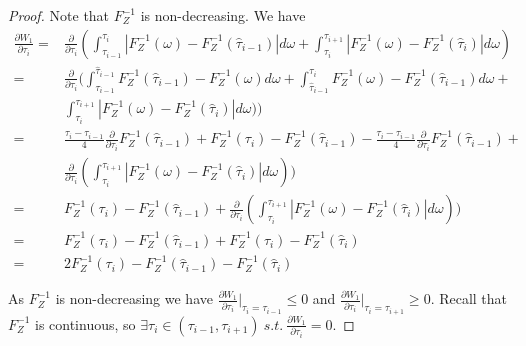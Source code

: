 \documentclass{article}
\begin{document}
\begin{proof}
Note that $F^{-1}_Z$ is non-decreasing. We have
\begin{equation*}
    \begin{split}
        \frac{\partial W_1}{\partial \tau_i}=&\frac{\partial}{\partial \tau_i}(\int_{\tau_{i-1}}^{\tau_i} \left|F^{-1}_{Z}(\omega)-F^{-1}_{Z}(\hat{\tau}_{i-1})\right| d \omega + \int_{\tau_{i}}^{\tau_{i+1}} \left|F^{-1}_{Z}(\omega)-F^{-1}_{Z}(\hat{\tau}_{i})\right| d \omega)\\
        =&\frac{\partial}{\partial \tau_i}(\int_{\tau_{i-1}}^{\hat{\tau}_{i-1}} F^{-1}_{Z}(\hat{\tau}_{i-1})-F^{-1}_{Z}(\omega) d \omega + 
        \int_{\hat{\tau}_{i-1}}^{\tau_{i}} F^{-1}_{Z}(\omega)-F^{-1}_{Z}(\hat{\tau}_{i-1}) d \omega +\\
        &
        \int_{\tau_{i}}^{\tau_{i+1}} \left|F^{-1}_{Z}(\omega)-F^{-1}_{Z}(\hat{\tau}_{i})\right| d \omega))\\
        =&\frac{\tau_i-\tau_{i-1}}{4}\frac{\partial}{\partial \tau_i}F^{-1}_Z(\hat{\tau}_{i-1})+F^{-1}_Z(\tau_i)-F^{-1}_Z(\hat{\tau}_{i-1})-\frac{\tau_i-\tau_{i-1}}{4}\frac{\partial}{\partial \tau_i}F^{-1}_Z(\hat{\tau}_{i-1})+\\
        &\frac{\partial}{\partial \tau_i}(\int_{\tau_{i}}^{\tau_{i+1}} \left|F^{-1}_{Z}(\omega)-F^{-1}_{Z}(\hat{\tau}_{i})\right| d \omega))\\
        =&F^{-1}_Z(\tau_i)-F^{-1}_Z(\hat{\tau}_{i-1})+\frac{\partial}{\partial \tau_i}(\int_{\tau_{i}}^{\tau_{i+1}} \left|F^{-1}_{Z}(\omega)-F^{-1}_{Z}(\hat{\tau}_{i})\right| d \omega))\\
        =&F^{-1}_Z(\tau_i)-F^{-1}_Z(\hat{\tau}_{i-1})+F^{-1}_Z(\tau_i)-F^{-1}_Z(\hat{\tau}_{i})\\
        =&2F^{-1}_Z(\tau_i)-F^{-1}_Z(\hat{\tau}_{i-1})-F^{-1}_Z(\hat{\tau}_{i})
    \end{split}
\end{equation*}


As $F^{-1}_Z$ is non-decreasing we have $\frac{\partial W_1}{\partial \tau_i}|_{\tau_i=\tau_{i-1}}\leq0$ and $\frac{\partial W_1}{\partial \tau_i}|_{\tau_i=\tau_{i+1}}\geq0$. Recall that $F^{-1}_Z$ is continuous, so $\exists \tau_i \in (\tau_{i-1}, \tau_{i+1}) \ s.t.\ \frac{\partial W_1}{\partial \tau_i}=0$.
\end{proof}

\newpage
\end{document}
